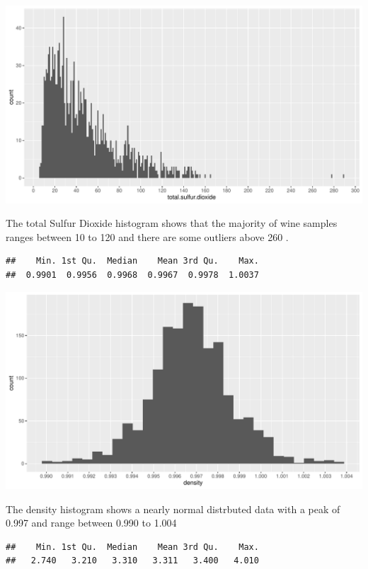 \documentclass[]{article}
\begin{document}
\begin{center}\includegraphics{Figs/unnamed-chunk-7-1} \end{center}

The total Sulfur Dioxide histogram shows that the majority of wine
samples ranges between 10 to 120 and there are some outliers above 260 .

\begin{verbatim}
##    Min. 1st Qu.  Median    Mean 3rd Qu.    Max. 
##  0.9901  0.9956  0.9968  0.9967  0.9978  1.0037
\end{verbatim}

\begin{center}\includegraphics{Figs/unnamed-chunk-8-1} \end{center}

The density histogram shows a nearly normal distrbuted data with a peak
of 0.997 and range between 0.990 to 1.004

\begin{verbatim}
##    Min. 1st Qu.  Median    Mean 3rd Qu.    Max. 
##   2.740   3.210   3.310   3.311   3.400   4.010
\end{verbatim}
\end{document}
